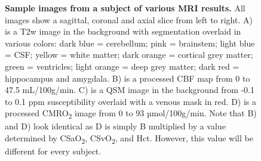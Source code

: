 \documentclass[
  letterpaper,
  DIV=11,
  numbers=noendperiod]{scrartcl}
\begin{document}
\begin{figure}


\caption{\label{fig-sampleimages}\textbf{Sample images from a subject of
various MRI results.} All images show a sagittal, coronal and axial
slice from left to right. A) is a T2w image in the background with
segmentation overlaid in various colors: dark blue = cerebellum; pink =
brainstem; light blue = CSF; yellow = white matter; dark orange =
cortical grey matter; green = ventricles; light orange = deep grey
matter; dark red = hippocampus and amygdala. B) is a processed CBF map
from 0 to 47.5 mL/100g/min. C) is a QSM image in the background from
-0.1 to 0.1 ppm susceptibility overlaid with a venous mask in red. D) is
a processed CMRO\textsubscript{2} image from 0 to 93 µmol/100g/min. Note
that B) and D) look identical as D is simply B multiplied by a value
determined by CSaO\textsubscript{2}, CSvO\textsubscript{2}, and Hct.
However, this value will be different for every subject.}

\end{figure}%
\end{document}
